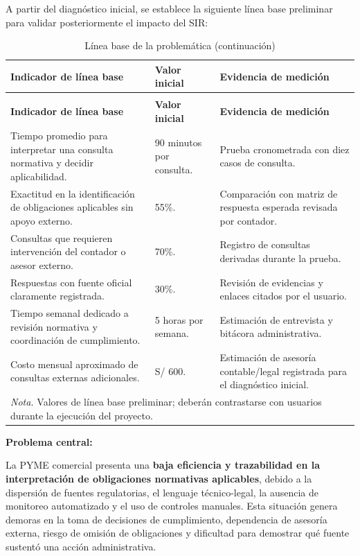 \documentclass[12pt,a4paper,oneside]{report}
\begin{document}
A partir del diagnóstico inicial, se establece la siguiente línea base preliminar para validar posteriormente el impacto del SIR:

\begin{longtable}{@{}p{}p{}p{}@{}}
\caption{Línea base de la problemática}\label{tab:linea-base-problematica}\\
\toprule
\textbf{Indicador de línea base} & \textbf{Valor inicial} & \textbf{Evidencia de medición} \\
\midrule
\endfirsthead
\caption[]{Línea base de la problemática (continuación)}\\
\toprule
\textbf{Indicador de línea base} & \textbf{Valor inicial} & \textbf{Evidencia de medición} \\
\midrule
\endhead
Tiempo promedio para interpretar una consulta normativa y decidir aplicabilidad. & 90 minutos por consulta. & Prueba cronometrada con diez casos de consulta. \\
Exactitud en la identificación de obligaciones aplicables sin apoyo externo. & 55\%. & Comparación con matriz de respuesta esperada revisada por contador. \\
Consultas que requieren intervención del contador o asesor externo. & 70\%. & Registro de consultas derivadas durante la prueba. \\
Respuestas con fuente oficial claramente registrada. & 30\%. & Revisión de evidencias y enlaces citados por el usuario. \\
Tiempo semanal dedicado a revisión normativa y coordinación de cumplimiento. & 5 horas por semana. & Estimación de entrevista y bitácora administrativa. \\
Costo mensual aproximado de consultas externas adicionales. & S/ 600. & Estimación de asesoría contable/legal registrada para el diagnóstico inicial. \\
\bottomrule
\multicolumn{3}{p{0.94\textwidth}}{\normalsize \textit{Nota.} Valores de línea base preliminar; deberán contrastarse con usuarios durante la ejecución del proyecto.}\\
\end{longtable}

\textbf{Problema central:}

La PYME comercial presenta una \textbf{baja eficiencia y trazabilidad en la interpretación de obligaciones normativas aplicables}, debido a la dispersión de fuentes regulatorias, el lenguaje técnico-legal, la ausencia de monitoreo automatizado y el uso de controles manuales. Esta situación genera demoras en la toma de decisiones de cumplimiento, dependencia de asesoría externa, riesgo de omisión de obligaciones y dificultad para demostrar qué fuente sustentó una acción administrativa.
\end{document}
